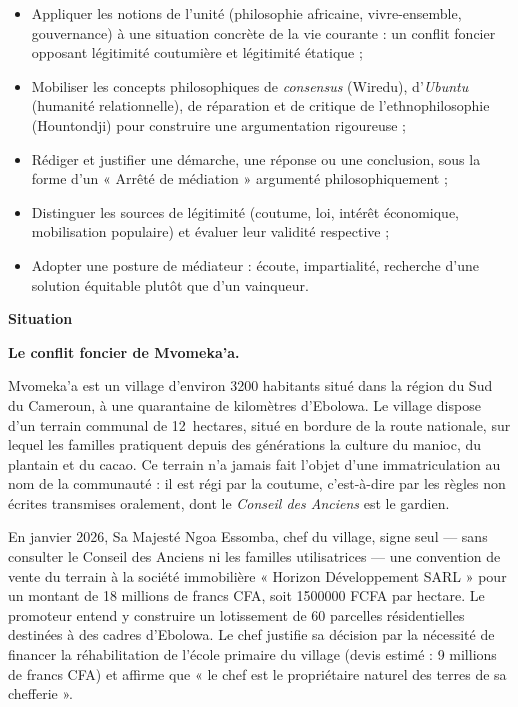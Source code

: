 \documentclass[11pt]{article}
\newcommand{\cle}[1]{{\popxbold\color{popdark}#1}}
\begin{document}
\begin{itemize}
\item \cle{Appliquer} les notions de l'unité (philosophie africaine, vivre-ensemble, gouvernance) à une situation concrète de la vie courante : un conflit foncier opposant légitimité coutumière et légitimité étatique ;
\item \cle{Mobiliser} les concepts philosophiques de \emph{consensus} (Wiredu), d'\emph{Ubuntu} (humanité relationnelle), de \cle{réparation} et de critique de l'ethnophilosophie (Hountondji) pour construire une argumentation rigoureuse ;
\item \cle{Rédiger et justifier} une démarche, une réponse ou une conclusion, sous la forme d'un « Arrêté de médiation » argumenté philosophiquement ;
\item \cle{Distinguer} les sources de légitimité (coutume, loi, intérêt économique, mobilisation populaire) et évaluer leur validité respective ;
\item \cle{Adopter} une posture de médiateur : écoute, impartialité, recherche d'une solution équitable plutôt que d'un vainqueur.
\end{itemize}

\textbf{Situation}

\textbf{Le conflit foncier de Mvomeka'a.}

Mvomeka'a est un village d'environ \num{3200} habitants situé dans la région du Sud du Cameroun, à une quarantaine de kilomètres d'Ebolowa. Le village dispose d'un terrain communal de \SI{12}{hectares}, situé en bordure de la route nationale, sur lequel les familles pratiquent depuis des générations la culture du manioc, du plantain et du cacao. Ce terrain n'a jamais fait l'objet d'une immatriculation au nom de la communauté : il est régi par la \cle{coutume}, c'est-à-dire par les règles non écrites transmises oralement, dont le \emph{Conseil des Anciens} est le gardien.

En janvier 2026, Sa Majesté Ngoa Essomba, chef du village, signe seul — sans consulter le Conseil des Anciens ni les familles utilisatrices — une convention de vente du terrain à la société immobilière « Horizon Développement SARL » pour un montant de 18 millions de francs CFA, soit \num{1500000} FCFA par hectare. Le promoteur entend y construire un lotissement de 60 parcelles résidentielles destinées à des cadres d'Ebolowa. Le chef justifie sa décision par la nécessité de financer la réhabilitation de l'école primaire du village (devis estimé : 9 millions de francs CFA) et affirme que « le chef est le propriétaire naturel des terres de sa chefferie ».
\end{document}
